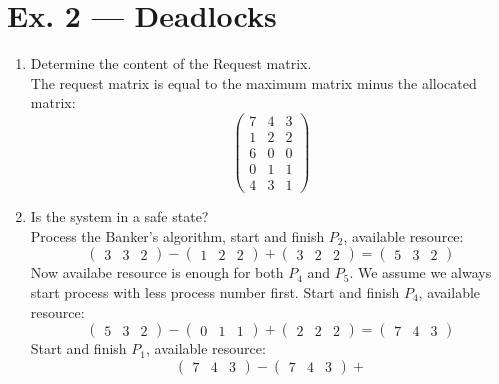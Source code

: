 \documentclass[a4paper]{article}
\begin{document}
\section*{Ex. 2 — Deadlocks}
\begin{enumerate}
    \item Determine the content of the Request matrix.\\
    The request matrix is equal to the maximum matrix minus the allocated matrix:
    \[\begin{pmatrix}
        7&4&3\\
        1&2&2\\
        6&0&0\\
        0&1&1\\
        4&3&1
    \end{pmatrix}\]
    \item Is the system in a safe state?\\
    Process the Banker's algorithm, start and finish $P_2$, available resource:\\
    \[\begin{pmatrix}
        3&3&2
    \end{pmatrix}-
    \begin{pmatrix}
        1&2&2
    \end{pmatrix}+
    \begin{pmatrix}
        3&2&2
    \end{pmatrix}=
    \begin{pmatrix}
        5&3&2
    \end{pmatrix}
    \]
    Now availabe resource is enough for both $P_4$ and $P_5$. We assume we always start process with less process number first. Start and finish $P_4$, available resource:
    \[\begin{pmatrix}
        5&3&2
    \end{pmatrix}-
    \begin{pmatrix}
        0&1&1
    \end{pmatrix}+
    \begin{pmatrix}
        2&2&2
    \end{pmatrix}=
    \begin{pmatrix}
        7&4&3
    \end{pmatrix}
    \]
    Start and finish $P_1$, available resource:
    \[\begin{pmatrix}
        7&4&3
    \end{pmatrix}-
    \begin{pmatrix}
        7&4&3
    \end{pmatrix}+
\]
\end{enumerate}
\end{document}
